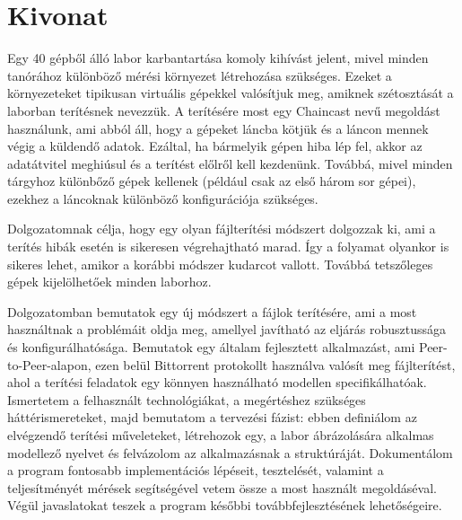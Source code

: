 \setcounter{page}{1}

\selecthungarian
\chapter*{Kivonat}

Egy 40 gépből álló labor karbantartása komoly kihívást jelent, mivel minden tanórához különböző mérési környezet létrehozása szükséges.
Ezeket a környezeteket tipikusan virtuális gépekkel valósítjuk meg, amiknek szétosztását a laborban terítésnek nevezzük. A terítésére most egy Chaincast nevű megoldást használunk, ami abból áll, hogy a gépeket láncba kötjük és a láncon mennek végig a küldendő adatok. Ezáltal, ha bármelyik gépen hiba lép fel, akkor az adatátvitel meghiúsul és a terítést előlről kell kezdenünk. Továbbá, mivel minden tárgyhoz különbőző gépek kellenek (például csak az első három sor gépei), ezekhez a láncoknak különböző konfigurációja szükséges.

Dolgozatomnak célja, hogy egy olyan fájlterítési módszert dolgozzak ki, ami a terítés hibák esetén is sikeresen végrehajtható marad. Így a folyamat olyankor is sikeres lehet, amikor a korábbi módszer kudarcot vallott. Továbbá tetszőleges gépek kijelölhetőek minden laborhoz.

Dolgozatomban bemutatok egy új módszert a fájlok terítésére, ami a most használtnak a problémáit oldja meg, amellyel javítható az eljárás robusztussága és konfigurálhatósága. Bemutatok egy általam fejlesztett alkalmazást, ami Peer-to-Peer-alapon, ezen belül Bittorrent protokollt használva valósít meg fájlterítést, ahol a terítési feladatok egy könnyen használható modellen specifikálhatóak. Ismertetem a felhasznált technológiákat, a megértéshez szükséges háttérismereteket, majd bemutatom a tervezési fázist: ebben definiálom az elvégzendő terítési műveleteket, létrehozok egy, a labor ábrázolására alkalmas modellező nyelvet és felvázolom az alkalmazásnak a struktúráját. Dokumentálom a program fontosabb implementációs lépéseit, tesztelését, valamint a teljesítményét mérések segítségével vetem össze a most használt megoldáséval. Végül javaslatokat teszek a program későbbi továbbfejlesztésének lehetőségeire.
\vfill

\selectenglish
